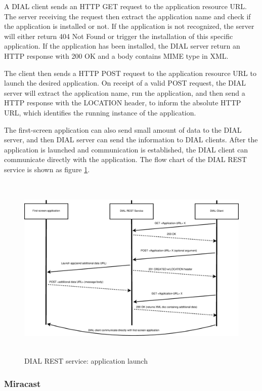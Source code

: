 \begin{enumerate}
A DIAL client sends an HTTP GET request to the application resource URL. 
The server receiving the request then extract the application name and check if the 
application is installed or not. If the application is not recognized, the 
server will either return 404 Not Found or trigger the installation of this specific 
application. If the application has been installed, the DIAL server return 
an HTTP response with 200 OK and a body contains MIME type in XML. 

The client then sends a HTTP POST request to the application resource URL to 
launch the desired application. On receipt of a valid POST request, the DIAL 
server will extract the application name, run the application, and then send 
a HTTP response with the LOCATION header, to inform the absolute HTTP URL, which 
identifies the running instance of the application. 

The first-screen application can also send small amount of data to the DIAL 
server, and then DIAL server can send the information to DIAL clients. 
After the application is launched and communication is established, the DIAL 
client can communicate directly with the application. The flow chart of  the DIAL REST service is  shown as figure \ref{dial_rest}. 

\begin{figure}[htb] \centering \includegraphics[height=9cm]{charts/dial_rest} 
\caption{DIAL REST service: application launch \label{dial_rest}} 
\end{figure} 
\end{enumerate} 

\subsubsection{Miracast} %

